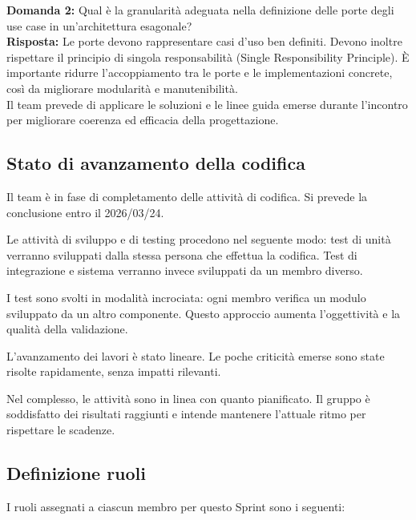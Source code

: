 \documentclass[a4paper,12pt]{article}
\begin{document}
\noindent\textbf{Domanda 2:} Qual è la granularità adeguata nella definizione delle porte degli use case in un'architettura esagonale? \\

\textbf{Risposta:} Le porte devono rappresentare casi d'uso ben definiti. 
Devono inoltre rispettare il principio di singola responsabilità (Single Responsibility Principle). 
È importante ridurre l'accoppiamento tra le porte e le implementazioni concrete, così da migliorare modularità e manutenibilità. \\

Il team prevede di applicare le soluzioni e le linee guida emerse durante l'incontro per migliorare coerenza ed efficacia della progettazione.

\subsection{Stato di avanzamento della codifica}

Il team è in fase di completamento delle attività di codifica. Si prevede la conclusione entro il 2026/03/24.

Le attività di sviluppo e di testing procedono nel seguente modo: test di unità verranno sviluppati dalla stessa persona che effettua la codifica. Test di integrazione e sistema verranno invece sviluppati da un membro diverso.

I test sono svolti in modalità incrociata: ogni membro verifica un modulo sviluppato da un altro componente. Questo 
approccio aumenta l'oggettività e la qualità della validazione.

L'avanzamento dei lavori è stato lineare. Le poche criticità emerse sono state risolte rapidamente, senza impatti 
rilevanti.

Nel complesso, le attività sono in linea con quanto pianificato. Il gruppo è soddisfatto dei risultati raggiunti e 
intende mantenere l'attuale ritmo per rispettare le scadenze.

\subsection{Definizione ruoli}

I ruoli assegnati a ciascun membro per questo Sprint sono i seguenti:
\end{document}
